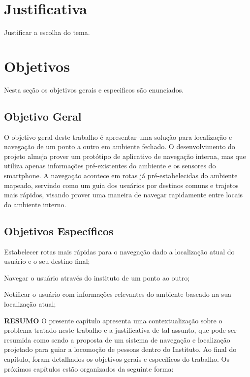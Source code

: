 \section{Justificativa}
Justificar a escolha do tema.



\section{Objetivos}
Nesta seção os objetivos gerais e especificos são enunciados.
\subsection{Objetivo Geral}
O objetivo geral deste trabalho é apresentar uma solução para localização e navegação de um ponto a outro em ambiente fechado. O desenvolvimento do projeto almeja prover um protótipo de aplicativo de navegação interna, mas que utiliza apenas informações pré-existentes do ambiente e os sensores do smartphone. A navegação acontece em rotas já pré-estabelecidas do ambiente mapeado, servindo como um guia dos usuários por destinos comuns e trajetos mais rápidos, visando prover uma maneira de navegar rapidamente entre locais do ambiente interno.



\subsection{Objetivos Específicos}
\begin{lista}
  \item Estabelecer rotas mais rápidas para o navegação dado a localização atual do usuário e o seu destino final;
  \item Navegar o usuário através do instituto de um ponto ao outro;
  \item Notificar o usuário com informações relevantes do ambiente baseado na sua localização atual;
\end{lista}

\textbf{RESUMO}
O presente capítulo apresenta uma contextualização sobre o problema tratado neste
trabalho e a justificativa de tal assunto, que pode ser resumida como sendo a proposta de um sistema de navegação e localização projetado para guiar a locomoção de pessoas dentro do Instituto.  Ao final do
capítulo, foram detalhados os objetivos gerais e específicos do trabalho.
Os próximos capítulos estão organizados da seguinte forma:


